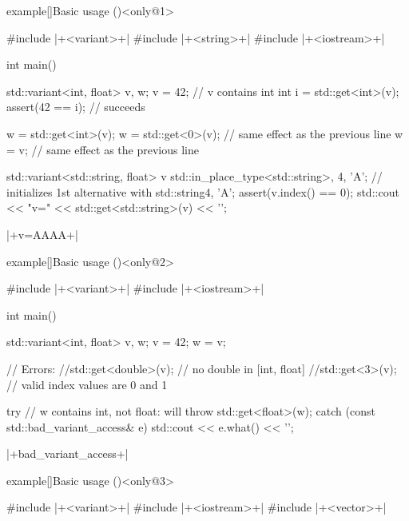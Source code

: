 \begin{frame}[fragile]{}
    \begin{varblock}{example}[\textwidth]{Basic usage (\overlaynumber)}<only@1>
        \begin{Cpp}
            #include |+<variant>+|
            #include |+<string>+|
            #include |+<iostream>+|

            int main()
            {
                std::variant<int, float> v, w;
                v = 42; // v contains int
                int i = std::get<int>(v);
                assert(42 == i); // succeeds

                w = std::get<int>(v);
                w = std::get<0>(v); // same effect as the previous line
                w = v;              // same effect as the previous line

                std::variant<std::string, float> v{
                    std::in_place_type<std::string>, 4, 'A'};
                // initializes 1st alternative with std::string{4, 'A'};
                assert(v.index() == 0);
                std::cout << "v=" << std::get<std::string>(v) << '\n';
            }
        \end{Cpp}
        \begin{Bash}[numbers=none]
            |+v=AAAA+|
        \end{Bash}
    \end{varblock}
    \begin{varblock}{example}[\textwidth]{Basic usage (\overlaynumber)}<only@2>
        \begin{Cpp}
            #include |+<variant>+|
            #include |+<iostream>+|

            int main()
            {
                std::variant<int, float> v, w;
                v = 42;
                w = v;

                // Errors:
                //std::get<double>(v); // no double in [int, float]
                //std::get<3>(v);      // valid index values are 0 and 1

                try {
                    // w contains int, not float: will throw
                    std::get<float>(w);
                }
                catch (const std::bad_variant_access& e) {
                    std::cout << e.what() << '\n';
                }
            }
        \end{Cpp}
        \begin{Bash}[numbers=none]
            |+bad_variant_access+|
        \end{Bash}
    \end{varblock}
    \begin{varblock}{example}[\textwidth]{Basic usage (\overlaynumber)}<only@3>
        \begin{Cpp}
            #include |+<variant>+|
            #include |+<iostream>+|
            #include |+<vector>+|


\end{Cpp}
\end{varblock}
\end{frame}
